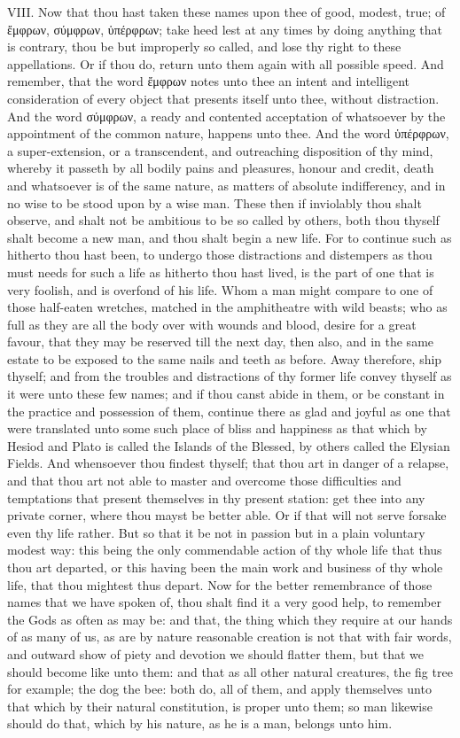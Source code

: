 VIII. Now that thou hast taken these names upon thee of good, modest,
true; of ἔμφρων,
σύμφρων,
ὑπέρφρων; take heed lest at any
times by doing anything that is contrary, thou be but improperly so
called, and lose thy right to these appellations. Or if thou do, return
unto them again with all possible speed. And remember, that the word
ἔμφρων notes unto thee an intent and
intelligent consideration of every object that presents itself unto thee,
without distraction. And the word
σύμφρων, a ready and contented
acceptation of whatsoever by the appointment of the common nature,
happens unto thee. And the word
ὑπέρφρων, a super-extension, or
a transcendent, and outreaching disposition of thy mind, whereby it
passeth by all bodily pains and pleasures, honour and credit, death and
whatsoever is of the same nature, as matters of absolute indifferency,
and in no wise to be stood upon by a wise man. These then if inviolably
thou shalt observe, and shalt not be ambitious to be so called by others,
both thou thyself shalt become a new man, and thou shalt begin a new
life. For to continue such as hitherto thou hast been, to undergo those
distractions and distempers as thou must needs for such a life as
hitherto thou hast lived, is the part of one that is very foolish, and is
overfond of his life. Whom a man might compare to one of those half-eaten
wretches, matched in the amphitheatre with wild beasts; who as full as
they are all the body over with wounds and blood, desire for a great
favour, that they may be reserved till the next day, then also, and in
the same estate to be exposed to the same nails and teeth as before. Away
therefore, ship thyself; and from the troubles and distractions of thy
former life convey thyself as it were unto these few names; and if thou
canst abide in them, or be constant in the practice and possession of
them, continue there as glad and joyful as one that were translated unto
some such place of bliss and happiness as that which by Hesiod and Plato
is called the Islands of the Blessed, by others called the Elysian
Fields. And whensoever thou findest thyself; that thou art in danger of a
relapse, and that thou art not able to master and overcome those
difficulties and temptations that present themselves in thy present
station: get thee into any private corner, where thou mayst be better
able. Or if that will not serve forsake even thy life rather. But so that
it be not in passion but in a plain voluntary modest way: this being the
only commendable action of thy whole life that thus thou art departed, or
this having been the main work and business of thy whole life, that thou
mightest thus depart. Now for the better remembrance of those names that
we have spoken of, thou shalt find it a very good help, to remember the
Gods as often as may be: and that, the thing which they require at our
hands of as many of us, as are by nature reasonable creation is not that
with fair words, and outward show of piety and devotion we should flatter
them, but that we should become like unto them: and that as all other
natural creatures, the fig tree for example; the dog the bee: both do,
all of them, and apply themselves unto that which by their natural
constitution, is proper unto them; so man likewise should do that, which
by his nature, as he is a man, belongs unto him.


